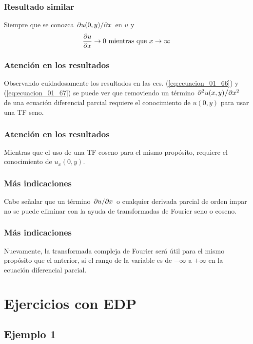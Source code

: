 \documentclass[12pt]{beamer}
\begin{document}
\begin{frame}
\frametitle{Resultado similar}
Siempre que se conozca $\pdv*{u (0, y)}{x}$ en $u$ y
\begin{align*}
\pdv{u}{x} \to 0 \mbox{ mientras que } x \to \infty
\end{align*}
\end{frame}
\begin{frame}
\frametitle{Atención en los resultados}
Observando cuidadosamente los resultados en las ecs. (\ref{eq:ecuacion_01_66}) y (\ref{eq:ecuacion_01_67}) se puede ver que removiendo un término $\pdv*[2]{u(x, y)}{x}$ de una ecuación diferencial parcial requiere el conocimiento de $u (0, y)$ para usar una TF seno.
\end{frame}
\begin{frame}
\frametitle{Atención en los resultados}
Mientras que el uso de una TF coseno para el mismo propósito, requiere el conocimiento de $u_{x} (0, y)$.
\end{frame}
\begin{frame}
\frametitle{Más indicaciones}
Cabe señalar que un término $\pdv*{u}{x}$ o cualquier derivada parcial de orden impar no se puede eliminar con la ayuda de transformadas de Fourier seno o coseno.
\end{frame}
\begin{frame}
\frametitle{Más indicaciones}
Nuevamente, la transformada compleja de Fourier será útil para el mismo propósito que el anterior, si el rango de la variable es de $- \infty$ a $+ \infty$ en la ecuación diferencial parcial.
\end{frame}

\section{Ejercicios con EDP}

\subsection{Ejemplo 1}
\end{document}
